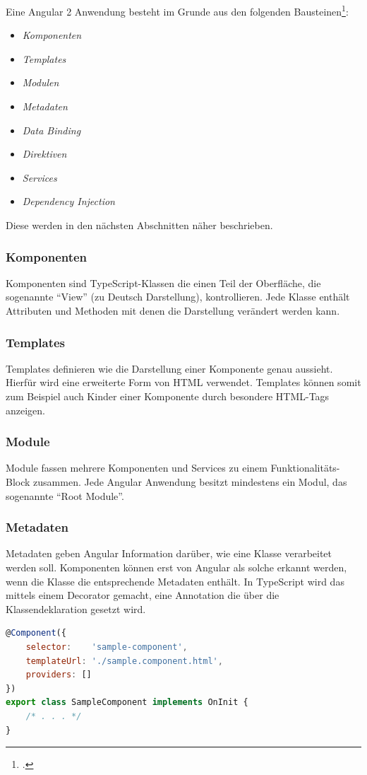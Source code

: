 Eine Angular 2 Anwendung besteht im Grunde aus den folgenden Bausteinen\footcite[Vgl.][]{Angular.io2017}:

\begin{itemize}
	\item \textit{Komponenten}
	\item \textit{Templates} 
	\item \textit{Modulen}
	\item \textit{Metadaten}
	\item \textit{Data Binding} 
	\item \textit{Direktiven}
	\item \textit{Services}
	\item \textit{Dependency Injection}
\end{itemize}

Diese werden in den nächsten Abschnitten näher beschrieben.

\subsubsection{Komponenten}
Komponenten sind TypeScript-Klassen die einen Teil der Oberfläche, die sogenannte \enquote{View} (zu Deutsch Darstellung), kontrollieren. Jede Klasse enthält Attributen und Methoden mit denen die Darstellung verändert werden kann.

\subsubsection{Templates}
Templates definieren wie die Darstellung einer Komponente genau aussieht. Hierfür wird eine erweiterte Form von \acs{HTML} verwendet. Templates können somit zum Beispiel auch Kinder einer Komponente durch besondere HTML-Tags anzeigen. 

\subsubsection{Module}
Module fassen mehrere Komponenten und Services zu einem Funktionalitäts-Block zusammen. Jede Angular Anwendung besitzt mindestens ein Modul, das sogenannte \enquote{Root Module}.

\subsubsection{Metadaten}
Metadaten geben Angular Information darüber, wie eine Klasse verarbeitet werden soll. Komponenten können erst von Angular als solche erkannt werden, wenn die Klasse die entsprechende Metadaten enthält. In TypeScript wird das mittels einem Decorator gemacht, eine Annotation die über die Klassendeklaration gesetzt wird.
\\
\begin{lstlisting}[language=JavaScript,caption={Beispiel Metadaten-Annotation für Komponenten},label=lst:metadata_ex]
@Component({
	selector:    'sample-component',
	templateUrl: './sample.component.html',
	providers: []
})
export class SampleComponent implements OnInit {
	/* . . . */
}
\end{lstlisting}

